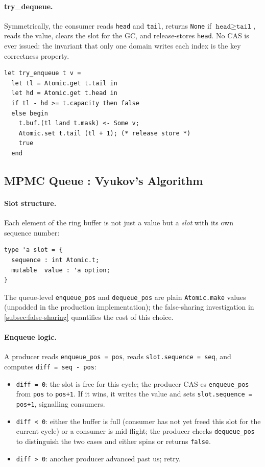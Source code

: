 \documentclass[11pt,a4paper]{article}
\begin{document}
\paragraph{try\_dequeue.}
Symmetrically, the consumer reads \texttt{head} and \texttt{tail}, returns
\texttt{None} if $\texttt{head} \geq \texttt{tail}$, reads the value, clears
the slot for the GC, and release-stores \texttt{head}. No CAS is ever issued:
the invariant that only one domain writes each index is the key correctness
property.

\begin{lstlisting}[caption={SPSC enqueue (no CAS required).}]
let try_enqueue t v =
  let tl = Atomic.get t.tail in
  let hd = Atomic.get t.head in
  if tl - hd >= t.capacity then false
  else begin
    t.buf.(tl land t.mask) <- Some v;
    Atomic.set t.tail (tl + 1); (* release store *)
    true
  end
\end{lstlisting}

\subsection{MPMC Queue : Vyukov's Algorithm}
\label{subsec:mpmc}

\paragraph{Slot structure.}
Each element of the ring buffer is not just a value but a \emph{slot} with its
own sequence number:

\begin{lstlisting}[caption={Per-slot record for Vyukov MPMC.}]
type 'a slot = {
  sequence : int Atomic.t;
  mutable  value : 'a option;
}
\end{lstlisting}

The queue-level \texttt{enqueue\_pos} and \texttt{dequeue\_pos} are plain
\texttt{Atomic.make} values (unpadded in the production implementation);
the false-sharing investigation in \cref{subsec:false-sharing} quantifies
the cost of this choice.

\paragraph{Enqueue logic.}
A producer reads \texttt{enqueue\_pos = pos}, reads \texttt{slot.sequence = seq},
and computes \texttt{diff = seq - pos}:
\begin{itemize}[noitemsep]
  \item \texttt{diff = 0}: the slot is free for this cycle; the producer CAS-es \texttt{enqueue\_pos} from \texttt{pos} to \texttt{pos+1}. If it wins, it writes the value and sets \texttt{slot.sequence = pos+1}, signalling consumers.
  \item \texttt{diff < 0}: either the buffer is full (consumer has not yet freed this slot for the current cycle) or a consumer is mid-flight; the producer checks \texttt{dequeue\_pos} to distinguish the two cases and either spins or returns \texttt{false}.
  \item \texttt{diff > 0}: another producer advanced past us; retry.
\end{itemize}
\end{document}
